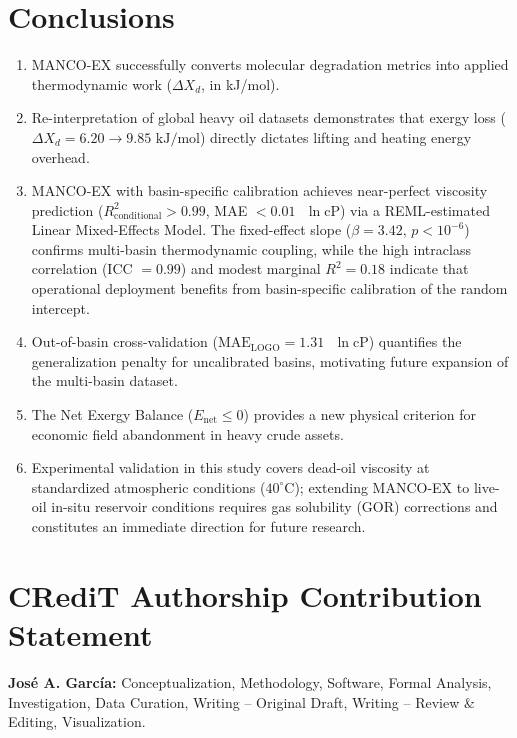 \documentclass[review,12pt]{elsarticle}
\begin{document}
\section{Conclusions}
\begin{enumerate}
    \item MANCO-EX successfully converts molecular degradation metrics into applied thermodynamic work ($\Delta X_d$, in kJ/mol).
    \item Re-interpretation of global heavy oil datasets \citep{lopez2014biodegradation, larter2012molecular, chang2022biodegradation, mahmoodi2019biodegradation} demonstrates that exergy loss ($\Delta X_d = 6.20 \rightarrow 9.85\text{ kJ/mol}$) directly dictates lifting and heating energy overhead.
    \item MANCO-EX with basin-specific calibration achieves near-perfect viscosity prediction ($R^2_{\text{conditional}} > 0.99$, MAE $< 0.01\text{ }\ln\text{cP}$) via a REML-estimated Linear Mixed-Effects Model. The fixed-effect slope ($\beta = 3.42$, $p < 10^{-6}$) confirms multi-basin thermodynamic coupling, while the high intraclass correlation (ICC $= 0.99$) and modest marginal $R^2 = 0.18$ indicate that operational deployment benefits from basin-specific calibration of the random intercept.
    \item Out-of-basin cross-validation ($\text{MAE}_{\text{LOGO}} = 1.31\text{ }\ln\text{cP}$) quantifies the generalization penalty for uncalibrated basins, motivating future expansion of the multi-basin dataset.
    \item The Net Exergy Balance ($E_{\text{net}} \le 0$) provides a new physical criterion for economic field abandonment in heavy crude assets.
    \item Experimental validation in this study covers dead-oil viscosity at standardized atmospheric conditions ($40^\circ\text{C}$); extending MANCO-EX to live-oil in-situ reservoir conditions requires gas solubility (GOR) corrections and constitutes an immediate direction for future research.
\end{enumerate}

\section*{CRediT Authorship Contribution Statement}
\textbf{José A. García:} Conceptualization, Methodology, Software, Formal Analysis, Investigation, Data Curation, Writing -- Original Draft, Writing -- Review \& Editing, Visualization.
\end{document}
